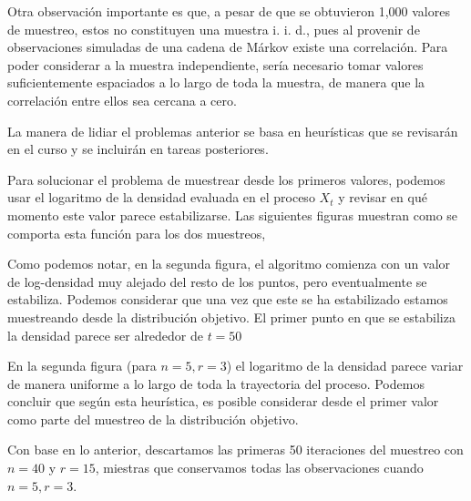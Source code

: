 \documentclass{article}
\begin{document}
\begin{enumerate}

    Otra observación importante es que, a pesar de que se obtuvieron 1,000 valores de muestreo, 
    estos no constituyen una muestra i. i. d., pues al provenir de observaciones simuladas de una cadena
    de Márkov existe una correlación. Para poder considerar a la muestra independiente, sería necesario
    tomar valores suficientemente espaciados a lo largo de toda la muestra, de manera que la correlación
    entre ellos sea cercana a cero. 

    La manera de lidiar el problemas anterior se basa en heurísticas que se revisarán en
    el curso y se incluirán en tareas posteriores. 

    Para solucionar el problema de muestrear desde los primeros valores, podemos usar el logaritmo
    de la densidad evaluada en el proceso $X_t$ y revisar en qué momento este valor parece estabilizarse.
    Las siguientes figuras muestran como se comporta esta función para los dos muestreos,

    \begin{center}
        
        
    \end{center}

    Como podemos notar, en la segunda figura, el algoritmo comienza con un valor de log-densidad
    muy alejado del resto de los puntos, pero eventualmente se estabiliza. Podemos considerar
    que una vez que este se ha estabilizado estamos muestreando desde la distribución objetivo.
    El primer punto en que se estabiliza la densidad parece ser alrededor de $t=50$

    En la segunda figura (para $n=5, r=3$) el logaritmo de la densidad parece variar de manera
    uniforme a lo largo de toda la trayectoria del proceso. Podemos concluir que según esta heurística,
    es posible considerar desde el primer valor como parte del muestreo de la distribución
    objetivo.

    Con base en lo anterior, descartamos las primeras 50 iteraciones del muestreo con $n=40$ y $r=15$,
    miestras que conservamos todas las observaciones cuando $n=5, r=3$.
    

\end{enumerate}
\end{document}
